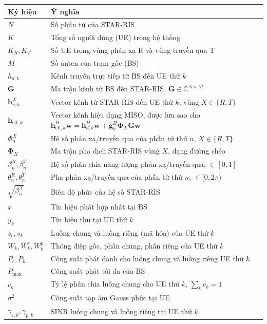\begin{longtable}{p{3.5cm} p{11cm}}
\toprule
\textbf{Ký hiệu} & \textbf{Ý nghĩa} \\
\midrule
\endhead
$N$ & Số phần tử của STAR-RIS \\
$K$ & Tổng số người dùng (UE) trong hệ thống \\
$K_R, K_T$ & Số UE trong vùng phản xạ R và vùng truyền qua T \\
$M$ & Số anten của trạm gốc (BS) \\
$h_{d,k}$ & Kênh truyền trực tiếp từ BS đến UE thứ $k$ \\
$\mathbf{G}$ & Ma trận kênh từ BS đến STAR-RIS, $\mathbf{G} \in \mathbb{C}^{N \times M}$ \\
$\mathbf{h}_{r,k}^X$ & Vector kênh từ STAR-RIS đến UE thứ $k$, vùng $X \in \{R, T\}$ \\
$\mathbf{h}_{\mathrm{eff},k}$ & Vector kênh hiệu dụng MISO, được lưu sao cho $\mathbf{h}_{\mathrm{eff},k}^{H}\mathbf{w}=\mathbf{h}_{d,k}^{H}\mathbf{w}+\mathbf{g}_{k}^{H}\boldsymbol{\Phi}_{X}\mathbf{G}\mathbf{w}$ \\
$\Phi_n^X$ & Hệ số phản xạ/truyền qua của phần tử thứ $n$, $X \in \{R, T\}$ \\
$\boldsymbol{\Phi}_X$ & Ma trận pha dịch STAR-RIS vùng $X$, dạng đường chéo \\
$\beta_n^R, \beta_n^T$ & Hệ số phân chia năng lượng phản xạ/truyền qua, $\in [0,1]$ \\
$\theta_n^R, \theta_n^T$ & Pha phản xạ/truyền qua của phần tử thứ $n$, $\in [0, 2\pi)$ \\
$\sqrt{\beta_n^X}$ & Biên độ phức của hệ số STAR-RIS \\
$x$ & Tín hiệu phát hợp nhất tại BS \\
$y_k$ & Tín hiệu thu tại UE thứ $k$ \\
$s_c, s_k$ & Luồng chung và luồng riêng (mã hóa) của UE thứ $k$ \\
$W_k, W_k^c, W_k^p$ & Thông điệp gốc, phần chung, phần riêng của UE thứ $k$ \\
$P_c, P_k$ & Công suất phát dành cho luồng chung và luồng riêng UE thứ $k$ \\
$P_{\max}$ & Công suất phát tối đa của BS \\
$c_k$ & Tỷ lệ phân chia luồng chung cho UE thứ $k$, $\sum_k c_k = 1$ \\
$\sigma^2$ & Công suất tạp âm Gauss phức tại UE \\
$\gamma_{c,k}, \gamma_{p,k}$ & SINR luồng chung và luồng riêng tại UE thứ $k$ \\

\end{longtable}
